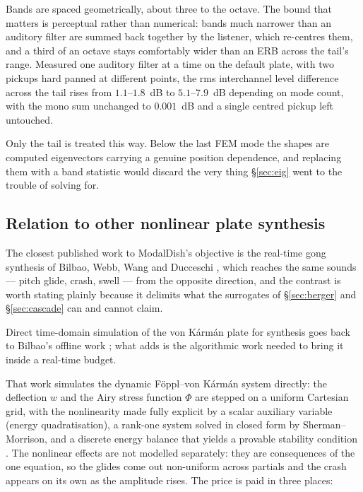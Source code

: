 \documentclass[11pt,a4paper]{article}
\begin{document}
Bands are spaced geometrically, about three to the octave. The bound
that matters is perceptual rather than numerical: bands much narrower
than an auditory filter are summed back together by the listener, which
re-centres them, and a third of an octave stays comfortably wider than
an ERB across the tail's range. Measured one auditory filter at a time
on the default plate, with two pickups hard panned at different points,
the rms interchannel level difference across the tail rises from
$1.1$--$1.8$~dB to $5.1$--$7.9$~dB depending on mode count, with the
mono sum unchanged to $0.001$~dB and a single centred pickup left
untouched.

Only the tail is treated this way. Below the last FEM mode the shapes
are computed eigenvectors carrying a genuine position dependence, and
replacing them with a band statistic would discard the very thing
\S\ref{sec:eig} went to the trouble of solving for.

\subsection{Relation to other nonlinear plate synthesis}
\label{sec:related}

The closest published work to ModalDish's objective is the real-time gong
synthesis of Bilbao, Webb, Wang and Ducceschi \cite{bilbao-gong23}, which
reaches the same sounds --- pitch glide, crash, swell --- from the opposite
direction, and the contrast is worth stating plainly because it delimits
what the surrogates of \S\ref{sec:berger} and \S\ref{sec:cascade} can and
cannot claim.

Direct time-domain simulation of the von K\'arm\'an plate for synthesis
goes back to Bilbao's offline work \cite{bilbao-nlplates,bilbao-vk}; what
\cite{bilbao-gong23} adds is the algorithmic work needed to bring it inside
a real-time budget.

That work simulates the dynamic F\"oppl--von K\'arm\'an system directly: the
deflection $w$ and the Airy stress function $\Phi$ are stepped on a uniform
Cartesian grid, with the nonlinearity made fully explicit by a scalar
auxiliary variable (energy quadratisation), a rank-one system solved in
closed form by Sherman--Morrison, and a discrete energy balance that yields
a provable stability condition \cite{bilbao-sav,bilbao-gong23}. The
nonlinear effects are not modelled separately: they are consequences of the
one equation, so the glides come out non-uniform across partials and the
crash appears on its own as the amplitude rises. The price is paid in three
places:
\end{document}
